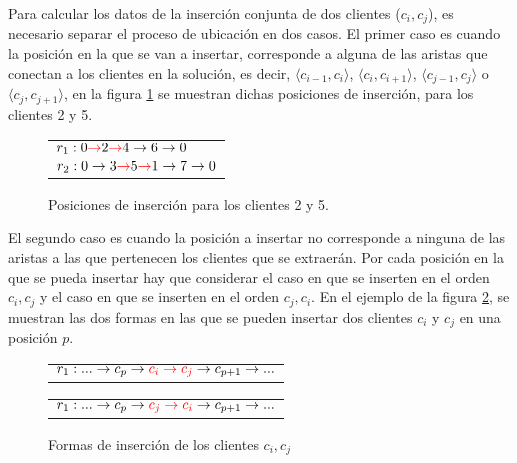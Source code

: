 \documentclass[12pt]{report}
\begin{document}
	Para calcular los datos de la inserción conjunta de dos clientes ($c_i,c_j$), es necesario separar el proceso de ubicación en dos casos. El primer caso es cuando la posición en la que se van a insertar, corresponde a alguna de las aristas que conectan a los clientes en la solución, es decir, $\langle c_{i-1}, c_i \rangle$, $\langle c_i, c_{i+1} \rangle$, $\langle c_{j-1}, c_j \rangle$ o $\langle c_j, c_{j+1} \rangle$, en la figura \ref{fig:perro} se muestran dichas posiciones de inserción, para los clientes 2 y 5.

	\begin{figure}[h]
		\centering
		\begin{tabular}{l}
			$r_1:0 \textcolor{red}{\rightarrow} 2 \textcolor{red}{\rightarrow} 4 \rightarrow 6 \rightarrow 0$ \\
			$r_2:0 \rightarrow 3 \textcolor{red}{\rightarrow} 5 \textcolor{red}{\rightarrow} 1 \rightarrow  7 \rightarrow0$ \\
		\end{tabular}
		\caption{Posiciones de inserción para los clientes 2 y 5.}
		\label{fig:perro}
	\end{figure}

	El segundo caso es cuando la posición a insertar no corresponde a ninguna de las aristas a las que pertenecen los clientes que se extraerán. Por cada posición en la que se pueda insertar hay que considerar el caso en que se inserten en el orden $c_i,c_j$ y el caso en que se inserten en el orden $c_j,c_i$. En el ejemplo de la figura \ref{fig:change ci,cj}, se muestran las dos formas en las que se pueden insertar dos clientes $c_i$ y $c_j$ en una posición $p$.

		\begin{figure}[h]
		\centering
		\begin{minipage}{0.45\textwidth}
			\begin{tabular}{l}
				$r_1: ... \rightarrow c_p \rightarrow \textcolor{red}{c_i \rightarrow c_j} \rightarrow c_{p+1} \rightarrow ...$ \\
			\end{tabular}
		\end{minipage}
		\hfill
		\begin{minipage}{0.45\textwidth}
			\begin{tabular}{l}
				$r_1: ... \rightarrow c_p \rightarrow \textcolor{red}{c_j \rightarrow c_i} \rightarrow c_{p+1} \rightarrow ...$ \\
			\end{tabular}
		\end{minipage}

		\caption{Formas de inserción de los clientes $c_i,c_j$}
		\label{fig:change ci,cj}
	\end{figure}
\end{document}
